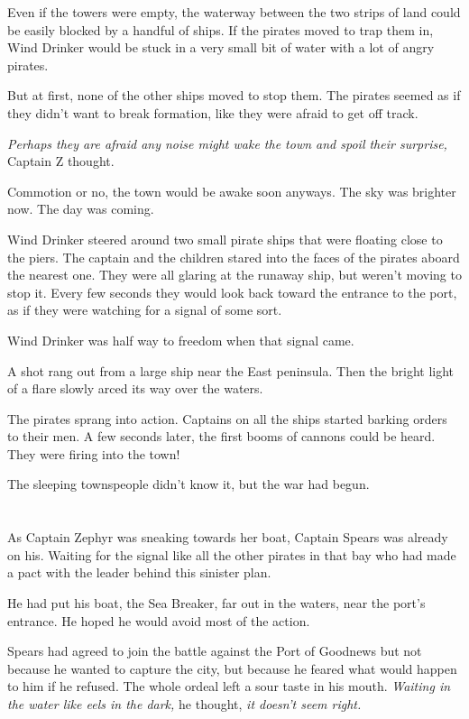 \documentclass[12pt]{extbook}
\begin{document}
  Even if the towers were empty, the waterway between the two strips of
  land could be easily blocked by a handful of ships. If the pirates moved
  to trap them in, Wind Drinker would be stuck in a very small bit of
  water with a lot of angry pirates.
  
  But at first, none of the other ships moved to stop them. The pirates
  seemed as if they didn't want to break formation, like they were afraid
  to get off track.
  
  \emph{Perhaps they are afraid any noise might wake the town and spoil
  their surprise,} Captain Z thought.
  
  Commotion or no, the town would be awake soon anyways. The sky was
  brighter now. The day was coming.
  
  Wind Drinker steered around two small pirate ships that were floating
  close to the piers. The captain and the children stared into the faces
  of the pirates aboard the nearest one. They were all glaring at the
  runaway ship, but weren't moving to stop it. Every few seconds they
  would look back toward the entrance to the port, as if they were
  watching for a signal of some sort.
  
  Wind Drinker was half way to freedom when that signal came.
  
  A shot rang out from a large ship near the East peninsula. Then the
  bright light of a flare slowly arced its way over the waters.
  
  The pirates sprang into action. Captains on all the ships started
  barking orders to their men. A few seconds later, the first booms of
  cannons could be heard. They were firing into the town!
  
  The sleeping townspeople didn't know it, but the war had begun.
  
  \section{}\label{section-35}
  
  As Captain Zephyr was sneaking towards her boat, Captain Spears was
  already on his. Waiting for the signal like all the other pirates in
  that bay who had made a pact with the leader behind this sinister plan.
  
  He had put his boat, the Sea Breaker, far out in the waters, near the
  port's entrance. He hoped he would avoid most of the action.
  
  Spears had agreed to join the battle against the Port of Goodnews but
  not because he wanted to capture the city, but because he feared what
  would happen to him if he refused. The whole ordeal left a sour taste in
  his mouth. \emph{Waiting in the water like eels in the dark,} he
  thought, \emph{it doesn't seem right.}
  
\end{document}
